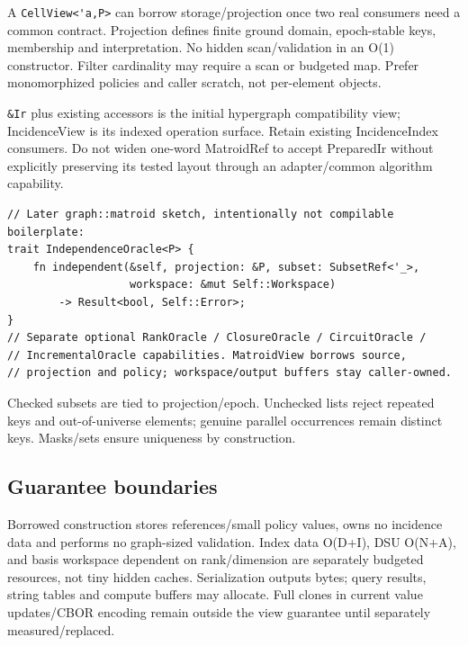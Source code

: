 \documentclass[10pt,a4paper]{article}
\newcommand{\code}[1]{{\small\nolinkurl{#1}}}
\begin{document}
A \code{CellView<'a,P>} can borrow storage/projection once two real consumers need a common contract. Projection defines finite ground domain, epoch-stable keys, membership and interpretation. No hidden scan/validation in an O(1) constructor. Filter cardinality may require a scan or budgeted map. Prefer monomorphized policies and caller scratch, not per-element objects.

\code{&Ir} plus existing accessors is the initial hypergraph compatibility view; IncidenceView is its indexed operation surface. Retain existing IncidenceIndex consumers. Do not widen one-word MatroidRef to accept PreparedIr without explicitly preserving its tested layout through an adapter/common algorithm capability.

\begin{lstlisting}
// Later graph::matroid sketch, intentionally not compilable boilerplate:
trait IndependenceOracle<P> {
    fn independent(&self, projection: &P, subset: SubsetRef<'_>,
                   workspace: &mut Self::Workspace)
        -> Result<bool, Self::Error>;
}
// Separate optional RankOracle / ClosureOracle / CircuitOracle /
// IncrementalOracle capabilities. MatroidView borrows source,
// projection and policy; workspace/output buffers stay caller-owned.
\end{lstlisting}
Checked subsets are tied to projection/epoch. Unchecked lists reject repeated keys and out-of-universe elements; genuine parallel occurrences remain distinct keys. Masks/sets ensure uniqueness by construction.

\subsection{Guarantee boundaries}
Borrowed construction stores references/small policy values, owns no incidence data and performs no graph-sized validation. Index data O(D+I), DSU O(N+A), and basis workspace dependent on rank/dimension are separately budgeted resources, not tiny hidden caches. Serialization outputs bytes; query results, string tables and compute buffers may allocate. Full clones in current value updates/CBOR encoding remain outside the view guarantee until separately measured/replaced.
\end{document}
